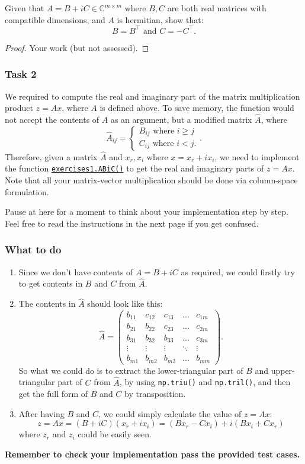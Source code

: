 \noindent Given that $A = B + iC \in \mathbb{C}^{m \times m}$ where $B, C$ are both real matrices with compatible dimensions, and  $A$ is hermitian, show that:
\[
  B = B^{\top} \text{ and } C = -C^{\top}
.\]
\begin{proof}
  Your work (but not assessed).
\end{proof}
\subsubsection*{Task 2}%
We required to compute the real and imaginary part of the matrix multiplication product $z = Ax$, where  $A$ is defined above. To save memory, the function would not accept the contents of $A$ as an argument, but a modified matrix $\hat{A}$, where
\[
\hat{A}_{ij} = \left\{
  \begin{array}{l}
  B_{ij} \text{ where } i \ge j \\
  C_{ij} \text{ where } i < j.
  \end{array}
\right.
.\] 
Therefore, given a matrix $\hat{A}$ and $x_r, x_i$ where  $x = x_r + ix_i$, we need to implement the function \href{https://comp-lin-alg.github.io/cla_utils.html#cla_utils.exercises1.ABiC}{\texttt{exercises1.ABiC()}} to get the real and imaginary parts of \(z = Ax\). Note that all your matrix-vector multiplication should be done via column-space formulation. \medskip

\noindent Pause at here for a moment to think about your implementation step by step. Feel free to read the instructions in the next page if you get confused.
\newpage
\subsubsection*{What to do}
\begin{enumerate}
\item Since we don't have contents of $A = B + iC$ as required, we could firstly try to get contents in $B$ and $C$ from $\hat{A}$.
\item The contents in $\hat{A}$ should look like this:
  \[
    \hat{A} = \begin{pmatrix} 
      b_{11} & c_{12} & c_{13} & \ldots & c_{1m} \\
      b_{21} & b_{22} & c_{23} & \ldots & c_{2m} \\
      b_{31} & b_{32} & b_{33} & \ldots & c_{3m} \\
      \vdots & \vdots & \vdots & \ddots & \vdots \\ 
      b_{m1} & b_{m2} & b_{m3} & \ldots & b_{mm}
    \end{pmatrix} 
  .\]
  So what we could do is to extract the lower-triangular part of $B$ and upper-triangular part of $C$ from $\hat{A}$, by using \texttt{np.triu()} and \texttt{np.tril()}, and then get the full form of $B$ and  $C$ by transposition.
 \item After having $B$ and $C$, we could simply calculate the value of  $z = Ax$:
    \[
      z = Ax = (B + iC)(x_r + ix_i) = (Bx_r - Cx_i) + i(Bx_i + Cx_r)
   \]
   where $z_r$ and $z_i$ could be easily seen. \checked
\end{enumerate}
\textbf{Remember to check your implementation pass the provided test cases.}
\newpage
